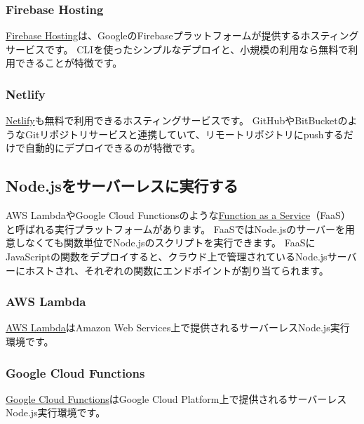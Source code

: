 \hypertarget{firebase-hosting}{%
\subsubsection{Firebase Hosting}\label{firebase-hosting}}

\href{https://firebase.google.com/products/hosting/?hl=ja}{Firebase
Hosting}は、GoogleのFirebaseプラットフォームが提供するホスティングサービスです。
CLIを使ったシンプルなデプロイと、小規模の利用なら無料で利用できることが特徴です。

\hypertarget{netlify}{%
\subsubsection{Netlify}\label{netlify}}

\href{https://www.netlify.com/}{Netlify}も無料で利用できるホスティングサービスです。
GitHubやBitBucketのようなGitリポジトリサービスと連携していて、リモートリポジトリにpushするだけで自動的にデプロイできるのが特徴です。

\hypertarget{serverless}{%
\subsection{Node.jsをサーバーレスに実行する}\label{serverless}}

AWS LambdaやGoogle Cloud
Functionsのような\href{https://en.wikipedia.org/wiki/Function_as_a_service}{Function
as a Service}（FaaS）と呼ばれる実行プラットフォームがあります。
FaaSではNode.jsのサーバーを用意しなくても関数単位でNode.jsのスクリプトを実行できます。
FaaSにJavaScriptの関数をデプロイすると、クラウド上で管理されているNode.jsサーバーにホストされ、それぞれの関数にエンドポイントが割り当てられます。

\hypertarget{aws-lambda}{%
\subsubsection{AWS Lambda}\label{aws-lambda}}

\href{https://aws.amazon.com/jp/lambda/}{AWS Lambda}はAmazon Web
Services上で提供されるサーバーレスNode.js実行環境です。

\hypertarget{google-cloud-functions}{%
\subsubsection{Google Cloud Functions}\label{google-cloud-functions}}

\href{https://cloud.google.com/functions/}{Google Cloud
Functions}はGoogle Cloud
Platform上で提供されるサーバーレスNode.js実行環境です。

